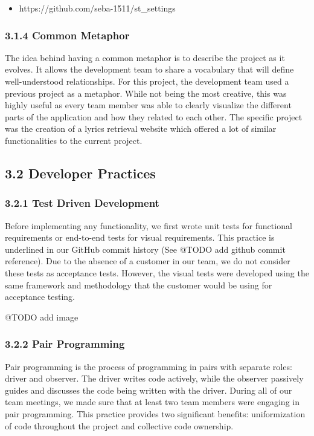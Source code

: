 \documentclass[]{article}
\begin{document}
\begin{itemize}
\itemsep1pt\parskip0pt
\item
  https://github.com/seba-1511/st\_settings
\end{itemize}

\subsubsection{3.1.4 Common Metaphor}\label{common-metaphor}

The idea behind having a common metaphor is to describe the project as
it evolves. It allows the development team to share a vocabulary that
will define well-understood relationships. For this project, the
development team used a previous project as a metaphor. While not being
the most creative, this was highly useful as every team member was able
to clearly visualize the different parts of the application and how they
related to each other. The specific project was the creation of a lyrics
retrieval website which offered a lot of similar functionalities to the
current project.

\subsection{3.2 Developer Practices}\label{developer-practices}

\subsubsection{3.2.1 Test Driven
Development}\label{test-driven-development}

Before implementing any functionality, we first wrote unit tests for
functional requirements or end-to-end tests for visual requirements.
This practice is underlined in our GitHub commit history (See @TODO add
github commit reference). Due to the absence of a customer in our team,
we do not consider these tests as acceptance tests. However, the visual
tests were developed using the same framework and methodology that the
customer would be using for acceptance testing.

@TODO add image

\subsubsection{3.2.2 Pair Programming}\label{pair-programming}

Pair programming is the process of programming in pairs with separate
roles: driver and observer. The driver writes code actively, while the
observer passively guides and discusses the code being written with the
driver. During all of our team meetings, we made sure that at least two
team members were engaging in pair programming. This practice provides
two significant benefits: uniformization of code throughout the project
and collective code ownership.
\end{document}

